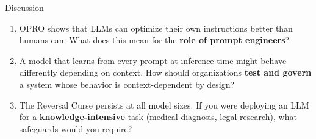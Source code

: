 \documentclass[aspectratio=169, 12pt]{beamer}
\begin{document}
\begin{frame}{Discussion}
  \begin{enumerate}
    \setlength\itemsep{14pt}
    \item OPRO shows that LLMs can optimize their own instructions
          better than humans can. What does this mean for the
          \textbf{role of prompt engineers}?

    \item A model that learns from every prompt at inference time
          might behave differently depending on context. How should
          organizations \textbf{test and govern} a system whose behavior
          is context-dependent by design?

    \item The Reversal Curse persists at all model sizes. If you were
          deploying an LLM for a \textbf{knowledge-intensive} task
          (medical diagnosis, legal research), what safeguards would
          you require?
  \end{enumerate}

\end{frame}
\end{document}
